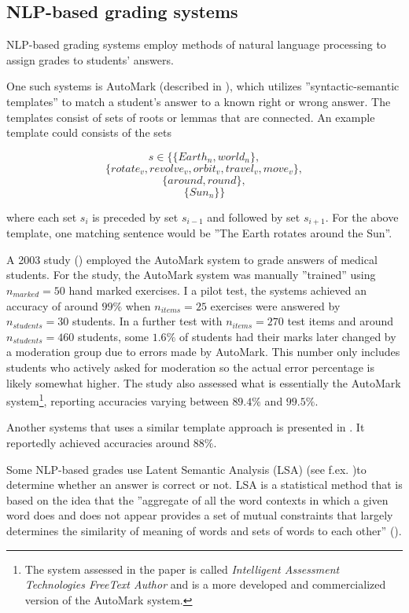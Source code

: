 \documentclass[english]{tktltiki2}
\theoremstyle{definition}
\theoremstyle{remark}
\begin{document}
\subsection{NLP-based grading systems}

NLP-based grading systems employ methods of natural language processing to assign grades to students' answers. 

One such systems is AutoMark (described in \cite{mitchell02}), which utilizes ''syntactic-semantic templates'' to match a student's answer to a known right or wrong answer. The templates consist of sets of roots or lemmas that are connected. An example template could consists of the sets 

$$s \in \{\{Earth_n, world_n\}, $$
$$\{rotate_v, revolve_v, orbit_v, travel_v, move_v\}, $$
$$\{around, round\},$$
$$ \{Sun_n\}\}$$

\noindent where each set $s_i$ is preceded by set $s_{i-1}$ and followed by set $s_{i+1}$. For the above template, one matching sentence would be ''The Earth rotates around the Sun''.

A 2003 study (\cite{mitchell03}) employed the AutoMark system to grade answers of medical students. For the study, the AutoMark system was manually ''trained'' using $n_{marked} = 50$ hand marked exercises. I a  pilot test, the systems achieved an accuracy of around $99\%$ when $n_{items} = 25$ exercises were answered by $n_{students} = 30$ students. In a further test with $n_{items} = 270$ test items and around $n_{students} = 460$ students, some $1.6\%$ of students had their marks later changed by a moderation group due to errors made by AutoMark. This number only includes students who actively asked for moderation so the actual error percentage is likely somewhat higher. The \cite{butcher10} study also assessed what is essentially the AutoMark system\footnote{The system assessed in the paper is called \emph{Intelligent Assessment Technologies FreeText Author} and is a more developed and commercialized version of the AutoMark system.}, reporting accuracies varying between $89.4\%$ and $99.5\%$.

Another systems that uses a similar template approach is presented in \cite{sukkarieh03}. It reportedly achieved accuracies around $88\%$.

Some NLP-based grades use Latent Semantic Analysis (LSA) (see f.ex. \cite{landauer98})to determine whether an answer is correct or not. LSA is a statistical method that is based on the idea that the ''aggregate of all the word contexts in which a given word does and does not appear provides a set of mutual constraints that largely determines the similarity of meaning of words and sets of words to each other'' (\cite{landauer98}). 
\end{document}
